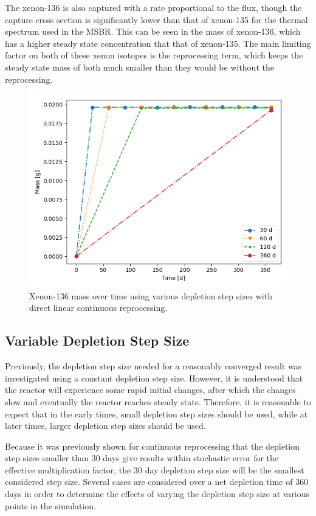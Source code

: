 The xenon-136 is also captured with a rate proportional to the flux, though the capture cross section is significantly lower than that of xenon-135 for the thermal spectrum used in the MSBR. This can be seen in the mass of xenon-136, which has a higher steady state concentration that that of xenon-135. The main limiting factor on both of these xenon isotopes is the reprocessing term, which keeps the steady state mass of both much smaller than they would be without the reprocessing.

\begin{figure}[H]
  \centering
  \includegraphics[scale=0.7]{images/DL_NSTEP_Xe-136_mass-large.png}
  \caption{Xenon-136 mass over time using various depletion step sizes with direct linear continuous reprocessing.}
   \label{fig:DL-cont-xe136-2}
\end{figure}


\subsection{Variable Depletion Step Size}

Previously, the depletion step size needed for a reasonably converged result was investigated using a constant depletion step size. However, it is understood that the reactor will experience some rapid initial changes, after which the changes slow and eventually the reactor reaches steady state. Therefore, it is reasonable to expect that in the early times, small depletion step sizes should be used, while at later times, larger depletion step sizes should be used.

Because it was previously shown for continuous reprocessing that the depletion step sizes smaller than 30 days give results within stochastic error for the effective multiplication factor, the 30 day depletion step size will be the smallest considered step size. Several cases are considered over a net depletion time of 360 days in order to determine the effects of varying the depletion step size at various points in the simulation.

